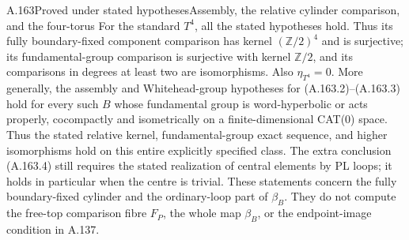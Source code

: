 \begin{saresult}{A.163}{Proved under stated hypotheses}{Assembly, the relative cylinder comparison, and the four-torus}
For the standard $T^4$, all the stated hypotheses hold. Thus its
fully boundary-fixed component comparison has kernel
$(\mathbb Z/2)^4$ and is surjective; its fundamental-group comparison
is surjective with kernel $\mathbb Z/2$, and its comparisons in degrees
at least two are isomorphisms. Also $\eta_{T^4}=0$.
More generally, the assembly and Whitehead-group hypotheses for
(A.163.2)--(A.163.3) hold for every such $B$ whose fundamental group is
word-hyperbolic or acts properly, cocompactly and isometrically on a
finite-dimensional CAT(0) space. Thus the stated relative kernel,
fundamental-group exact sequence, and higher isomorphisms hold on this
entire explicitly specified class. The extra conclusion (A.163.4) still
requires the stated realization of central elements by PL loops; it
holds in particular when the centre is trivial.
These statements concern the fully boundary-fixed cylinder and the
ordinary-loop part of $\beta_B$. They do not compute the free-top
comparison fibre $F_P$, the whole map $\beta_B$, or the endpoint-image
condition in A.137.

\end{saresult}

